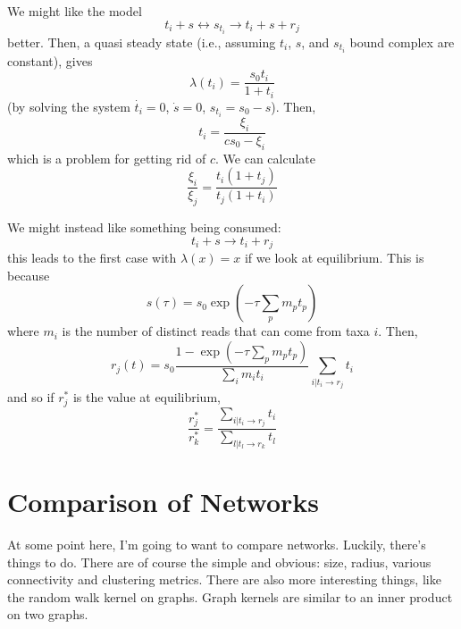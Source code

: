 \documentclass[10pt]{article}
\theoremstyle{definition}
\numberwithin{theorem}{section}
\numberwithin{definition}{section}
\numberwithin{lemma}{section}
\numberwithin{corollary}{section}
\numberwithin{clm}{section}
\numberwithin{rmk}{section}
\begin{document}
We might like the model 
\[
t_i + s \leftrightarrow s_{t_i} \rightarrow t_i + s + r_j
\] 
better. Then, a quasi steady state (i.e., assuming $t_i$, $s$, and $s_{t_i}$ bound complex are constant), gives
\[
\lambda(t_i) = \frac{s_0 t_i}{1 + t_i}
\]
(by solving the system $\dot{t_i} = 0$, $\dot{s} = 0$, 	$s_{t_i} = s_0 - s$). Then,
\[
t_i = \frac{\xi_i}{cs_0  - \xi_i} 
\]
which is a problem for getting rid of $c$. We can calculate
\[
\frac{\xi_i}{\xi_j} = \frac{t_i(1+t_j)}{t_j(1+t_i)}
\]

We might instead like something being consumed:
\[
t_i + s \rightarrow t_i + r_j
\]
this leads to the first case with $\lambda(x) = x$ if we look at equilibrium. This is because
\[
s(\tau) = s_0 \exp\left(-\tau \sum_{p} m_p t_p\right)
\]
where $m_i$ is the number of distinct reads that can come from taxa $i$. Then, 
\[
r_j(t) = s_0 \frac{1 - \exp\left(-\tau \sum_{p} m_p t_p\right)}{\sum_i m_i t_i}\sum_{i|t_i \rightarrow r_j} t_i
\]
and so if $r_j^*$ is the value at equilibrium,
\[
\frac{r_j^*}{r_k^*} = \frac{\sum_{i|t_i\rightarrow r_j} t_i}{\sum_{l|t_l\rightarrow r_k} t_l}
\]

\section{Comparison of Networks}
At some point here, I'm going to want to compare networks. Luckily, there's things to do. There are of course the simple and obvious: size, radius, various connectivity and clustering metrics. There are also more interesting things, like the random walk kernel on graphs. Graph kernels are similar to an inner product on two graphs.
\end{document}
